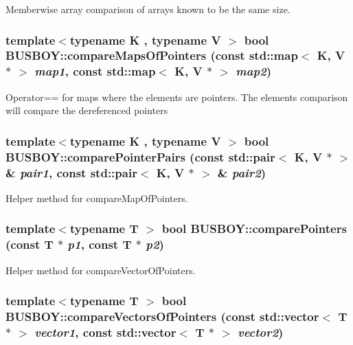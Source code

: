 Memberwise array comparison of arrays known to be the same size. \hypertarget{namespaceBUSBOY_a2f0bdbc11fc2b82453ee5929bdf887bc}{
\subsubsection[{compareMapsOfPointers}]{\setlength{\rightskip}{0pt plus 5cm}template$<$typename K , typename V $>$ bool BUSBOY::compareMapsOfPointers (const std::map$<$ K, V $\ast$ $>$ {\em map1}, \/  const std::map$<$ K, V $\ast$ $>$ {\em map2})}}
\label{namespaceBUSBOY_a2f0bdbc11fc2b82453ee5929bdf887bc}


Operator== for maps where the elements are pointers. The elements comparison will compare the dereferenced pointers \hypertarget{namespaceBUSBOY_a6596aa28107eeff9118f3104c26c7885}{
\subsubsection[{comparePointerPairs}]{\setlength{\rightskip}{0pt plus 5cm}template$<$typename K , typename V $>$ bool BUSBOY::comparePointerPairs (const std::pair$<$ K, V $\ast$ $>$ \& {\em pair1}, \/  const std::pair$<$ K, V $\ast$ $>$ \& {\em pair2})}}
\label{namespaceBUSBOY_a6596aa28107eeff9118f3104c26c7885}


Helper method for compareMapOfPointers. \hypertarget{namespaceBUSBOY_ada56f4be13026b9d79af28c8d7e97991}{
\subsubsection[{comparePointers}]{\setlength{\rightskip}{0pt plus 5cm}template$<$typename T $>$ bool BUSBOY::comparePointers (const T $\ast$ {\em p1}, \/  const T $\ast$ {\em p2})}}
\label{namespaceBUSBOY_ada56f4be13026b9d79af28c8d7e97991}


Helper method for compareVectorOfPointers. \hypertarget{namespaceBUSBOY_ab0e8dfb62808cc1ad5e55a91524bac51}{
\subsubsection[{compareVectorsOfPointers}]{\setlength{\rightskip}{0pt plus 5cm}template$<$typename T $>$ bool BUSBOY::compareVectorsOfPointers (const std::vector$<$ T $\ast$ $>$ {\em vector1}, \/  const std::vector$<$ T $\ast$ $>$ {\em vector2})}}
\label{namespaceBUSBOY_ab0e8dfb62808cc1ad5e55a91524bac51}



